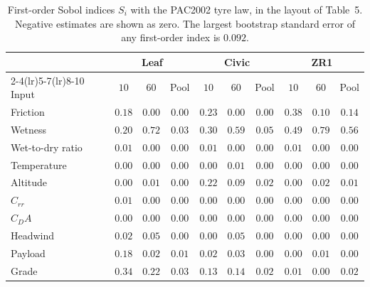 \documentclass[12pt, twoside]{amsart}
\theoremstyle{definition}
\newcommand{\mainref}[2]{#2}
\begin{document}
\begin{table}[htbp]
\centering\small
\setlength{\tabcolsep}{4.2pt}
\caption{First-order Sobol indices $S_i$ with the PAC2002 tyre law, in the layout of Table~\mainref{tab:sobol}{5}. Negative estimates are shown as zero. The largest bootstrap standard error of any first-order index is $0.092$.}\label{tab:app-sobol-first}
\begin{tabular}{lccccccccc}
\toprule
& \multicolumn{3}{c}{Leaf} & \multicolumn{3}{c}{Civic} & \multicolumn{3}{c}{ZR1}\\
\cmidrule(lr){2-4}\cmidrule(lr){5-7}\cmidrule(lr){8-10}
Input & $10$ & $60$ & Pool & $10$ & $60$ & Pool & $10$ & $60$ & Pool\\
\midrule
Friction & $0.18$ & $0.00$ & $0.00$ & $0.23$ & $0.00$ & $0.00$ & $0.38$ & $0.10$ & $0.14$\\
Wetness & $0.20$ & $0.72$ & $0.03$ & $0.30$ & $0.59$ & $0.05$ & $0.49$ & $0.79$ & $0.56$\\
Wet-to-dry ratio & $0.01$ & $0.00$ & $0.00$ & $0.01$ & $0.00$ & $0.00$ & $0.01$ & $0.00$ & $0.00$\\
Temperature & $0.00$ & $0.00$ & $0.00$ & $0.00$ & $0.01$ & $0.00$ & $0.00$ & $0.00$ & $0.00$\\
Altitude & $0.00$ & $0.01$ & $0.00$ & $0.22$ & $0.09$ & $0.02$ & $0.00$ & $0.02$ & $0.01$\\
$C_{rr}$ & $0.01$ & $0.00$ & $0.00$ & $0.00$ & $0.00$ & $0.00$ & $0.00$ & $0.00$ & $0.00$\\
$C_DA$ & $0.00$ & $0.00$ & $0.00$ & $0.00$ & $0.00$ & $0.00$ & $0.00$ & $0.00$ & $0.00$\\
Headwind & $0.02$ & $0.05$ & $0.00$ & $0.00$ & $0.05$ & $0.00$ & $0.00$ & $0.00$ & $0.00$\\
Payload & $0.18$ & $0.02$ & $0.01$ & $0.02$ & $0.03$ & $0.00$ & $0.00$ & $0.01$ & $0.00$\\
Grade & $0.34$ & $0.22$ & $0.03$ & $0.13$ & $0.14$ & $0.02$ & $0.01$ & $0.00$ & $0.02$\\
\bottomrule
\end{tabular}
\end{table}
\end{document}
